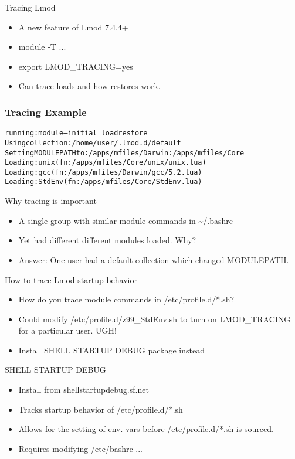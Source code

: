 \documentclass[dvipsnames,aspectratio=169]{beamer}
\begin{document}
\begin{frame}{Tracing Lmod}
  \begin{itemize}
    \item A new feature of Lmod 7.4.4+
    \item module -T ...
    \item export LMOD\_TRACING=yes
    \item Can trace loads and how restores work.
  \end{itemize}
\end{frame}

\begin{frame}[fragile]
    \frametitle{Tracing Example}
  {\small
    \begin{alltt}
running: module --initial_load restore
  Using collection:      /home/user/.lmod.d/default
  Setting MODULEPATH to: /apps/mfiles/Darwin:/apps/mfiles/Core
  Loading: unix (fn: /apps/mfiles/Core/unix/unix.lua)
  Loading: gcc (fn: /apps/mfiles/Darwin/gcc/5.2.lua)
  Loading: StdEnv (fn: /apps/mfiles/Core/StdEnv.lua)
    \end{alltt}
}
\end{frame}


\begin{frame}{Why tracing is important}
  \begin{itemize}
    \item A single group with similar module commands in \textasciitilde/.bashrc
    \item Yet had different different modules loaded. Why?
    \item Answer: One user had a default collection which changed MODULEPATH.
  \end{itemize}
\end{frame}

\begin{frame}{How to trace Lmod startup behavior}
  \begin{itemize}
    \item How do you trace module commands in /etc/profile.d/*.sh?
    \item Could modify /etc/profile.d/z99\_StdEnv.sh to turn on
      LMOD\_TRACING for a particular user. UGH!
    \item Install SHELL STARTUP DEBUG package instead
  \end{itemize}
\end{frame}

\begin{frame}{SHELL STARTUP DEBUG}
  \begin{itemize}
    \item Install from shellstartupdebug.sf.net
    \item Tracks startup behavior of /etc/profile.d/*.sh
    \item Allows for the setting of env. vars before
      /etc/profile.d/*.sh is sourced.
    \item Requires modifying /etc/bashrc ...
  \end{itemize}
\end{frame}
\end{document}
